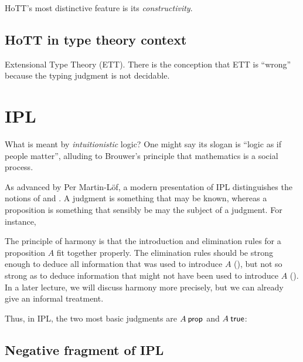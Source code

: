 \documentclass[12pt]{article}
\begin{document}
\Acs{HoTT}'s most distinctive feature is its \emph{constructivity}.

\subsection{\Acs{HoTT} in type theory context}\label{subsec:type_theory_context}

Extensional Type Theory (ETT).  There is the conception that ETT is ``wrong''~\cite{Harper2012}
because the typing judgment is not decidable.

\section{\Acl{IPL}}\label{sec:ipl}


What is meant by \emph{intuitionistic} logic?  One might say its slogan is ``logic as if people matter'', alluding to Brouwer's principle that mathematics is a social process.

As advanced by Per Martin-L\"{o}f, a modern presentation of \acf{IPL} distinguishes the notions of  and .
A judgment is something that may be known, whereas a proposition is something that sensibly be may the subject of a judgment.
For instance, 


The principle of harmony is that the introduction and elimination rules for a proposition $A$ fit together properly.  The elimination rules should be strong enough to deduce all information that was used to introduce $A$ (), but not so strong as to deduce information that might not have been used to introduce $A$ ().  In a later lecture, we will discuss harmony more precisely, but we can already give an informal treatment.


Thus, in \ac{IPL}, the two most basic judgments are $A \prop$ and $A \true$:


\subsection{Negative fragment of \ac{IPL}}\label{sec:ipl-negative}
\end{document}
